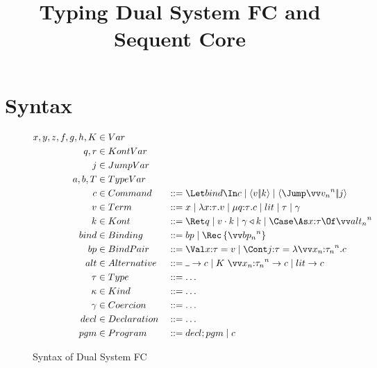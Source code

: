 \documentclass{article}
\begin{document}
\title{Typing Dual System FC and Sequent Core}

\maketitle

\section{Syntax}
\label{sec:syntax}

\begin{figure}[h]
\centering
\begin{gather*}
\begin{aligned}
  x, y, z, f, g, h, K &\in Var
  \\
  q, r &\in KontVar
  \\
  j &\in JumpVar
  \\
  a, b, T &\in TypeVar
  \\
  \cmd &\in Command
  &
  &::= \Let \abind \In c
  \Alt \cut{\tm}{\ko}
  \Alt \jump{\vect[n]{\tm_n}}{j}
  \\
  \tm &\in Term
  &
  &::= x
  \Alt \fn{\ann x \ty} \tm
  \Alt \compute{\ann q \ty} \cmd
  \Alt \lit
  \Alt \ty
  \Alt \cn
  \\
  \ko &\in Kont
  &
  &::= \ret q
  \Alt \app{\tm}{\ko}
  \Alt \koerce{\cn}{\ko}
  \Alt \caseas{\ann x \ty}{\vect[n]{\analt_n}}
  \\
  \abind &\in Binding
  &
  &::= \nonrec \bp
  \Alt \rec{\vect[n]{\bp_n}}
  \\
  \bp &\in BindPair
  &
  &::= \bindv{\ann x \ty}{\tm}
  \Alt \bindk{\ann j \ty}{\fnk{\vect[n]{\ann{x_n}{\ty_n}}}\cmd}
  \\
  \analt &\in Alternative
  &
  &::= \alt{\blank}{\cmd}
  \Alt \alt{K ~ \vect[n]{\ann{x_n}{\ty_n}}}{\cmd}
  \Alt \alt{\lit}{\cmd}
  \\
  \ty &\in Type
  &
  &::= \dots
  \\
  \ki &\in Kind
  &
  &::= \dots
  \\
  \cn &\in Coercion
  &
  &::= \dots
  \\
  \decl &\in Declaration
  &
  &::= \dots
  \\
  \pgm &\in Program
  &
  &::= \decl; \pgm
  \Alt \cmd
\end{aligned}
\end{gather*}
\caption{Syntax of Dual System FC}
\label{fig:dual-fc-syntax}
\end{figure}
\end{document}
